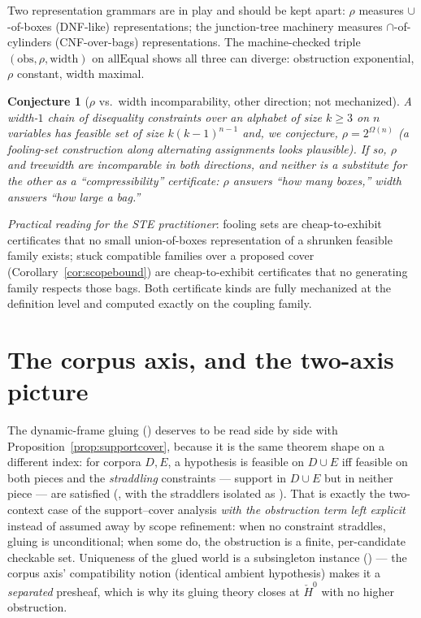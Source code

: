 \documentclass[11pt]{article}
\newtheorem{conjecture}{Conjecture}
\newcommand{\rectrho}{\rho}
\newcommand{\obs}{\mathrm{obs}}
\newcommand{\Hech}{\check H}
\begin{document}
Two representation grammars are in play and should be kept apart:
$\rectrho$ measures $\cup$-of-boxes (DNF-like) representations;
the junction-tree machinery measures $\cap$-of-cylinders
(CNF-over-bags) representations.  The machine-checked triple
$(\obs, \rectrho, \text{width})$ on $\mathrm{allEqual}$ shows all
three can diverge: obstruction exponential, $\rectrho$ constant,
width maximal.

\begin{conjecture}[$\rectrho$ vs.\ width incomparability, other
direction; not mechanized]
A width-$1$ chain of disequality constraints over an alphabet of size
$k \ge 3$ on $n$ variables has feasible set of size
$k(k-1)^{n-1}$ and, we conjecture, $\rectrho = 2^{\Omega(n)}$ (a
fooling-set construction along alternating assignments looks
plausible).  If so, $\rectrho$ and treewidth are incomparable in both
directions, and neither is a substitute for the other as a
``compressibility'' certificate: $\rectrho$ answers ``how many boxes,''
width answers ``how large a bag.''
\end{conjecture}

\emph{Practical reading for the STE practitioner}: fooling sets are
cheap-to-exhibit certificates that no small union-of-boxes
representation of a shrunken feasible family exists; stuck compatible
families over a proposed cover (Corollary~\ref{cor:scopebound}) are
cheap-to-exhibit certificates that no generating family respects
those bags.  Both certificate kinds are fully mechanized at the
definition level and computed exactly on the coupling family.

\section{The corpus axis, and the two-axis picture}
\label{sec:corpus}

The dynamic-frame gluing ()
deserves to be read side by side with
Proposition~\ref{prop:supportcover}, because it is the same theorem
shape on a different index: for corpora $D, E$, a hypothesis is
feasible on $D \cup E$ iff feasible on both pieces and the
\emph{straddling} constraints --- support in $D \cup E$ but in
neither piece --- are satisfied (, with
the straddlers isolated as ).  That is
exactly the two-context case of the support--cover analysis
\emph{with the obstruction term left explicit} instead of assumed
away by scope refinement: when no constraint straddles, gluing is
unconditional; when some do, the obstruction is a finite, per-candidate
checkable set.  Uniqueness of the glued world is a subsingleton
instance () --- the corpus axis'
compatibility notion (identical ambient hypothesis) makes it a
\emph{separated} presheaf, which is why its gluing theory closes at
$\Hech^0$ with no higher obstruction.
\end{document}
